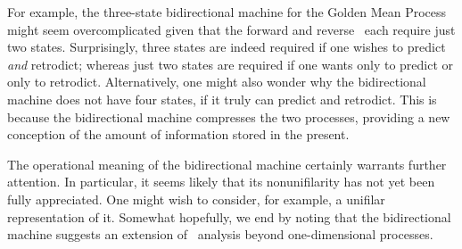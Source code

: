 For example, the three-state bidirectional machine for the Golden Mean Process 
might seem overcomplicated given that the forward and reverse \eMs\ each 
require just two states.  Surprisingly, three states are indeed required if 
one wishes to predict \textit{and} retrodict; whereas just two states are 
required if one wants only to predict or only to retrodict.  Alternatively, 
one might also wonder why the bidirectional machine does not have four states, 
if it truly can predict and retrodict.  This is because the bidirectional 
machine compresses the two processes, providing a new conception of the amount 
of information stored in the present.

The operational meaning
of the bidirectional machine certainly warrants further attention. In 
particular, it seems likely that its nonunifilarity has not yet been fully 
appreciated. One might wish to consider, for example, a unifilar representation 
of it. Somewhat hopefully, we end by noting that the bidirectional machine 
suggests an extension of \eM\ analysis beyond one-dimensional processes.

\ifx\master\undefined\fi

